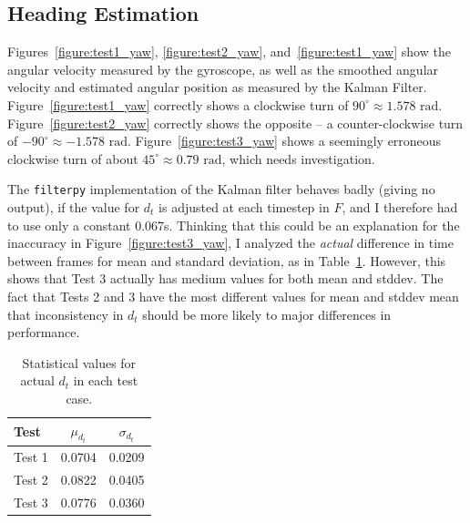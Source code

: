 \subsection{Heading Estimation}

Figures~\ref{figure:test1_yaw}, \ref{figure:test2_yaw}, and~\ref{figure:test1_yaw} show the
angular velocity measured by the gyroscope,
as well as the smoothed angular velocity and estimated angular position as measured by the Kalman Filter.
Figure~\ref{figure:test1_yaw} correctly shows a clockwise turn of $90^\circ \approx 1.578 \text{ rad}$.
Figure~\ref{figure:test2_yaw} correctly shows the opposite -- a counter-clockwise turn of
$-90^\circ \approx -1.578 \text{ rad}$.
Figure~\ref{figure:test3_yaw} shows a seemingly erroneous clockwise turn of about $45^\circ \approx 0.79\text{ rad}$, which needs investigation.

The \texttt{filterpy} implementation of the Kalman filter behaves badly (giving no output),
if the value for $d_t$ is adjusted at each timestep in $F$,
and I therefore had to use only a constant 0.067s.
Thinking that this could be an explanation for the inaccuracy in Figure~\ref{figure:test3_yaw},
I analyzed the \emph{actual} difference in time between frames for mean and standard deviation,
as in Table~\ref{table:dt_statistical_values}.
However, this shows that Test 3 actually has medium values for both mean and stddev.
The fact that Tests 2 and 3 have the most different values for mean and stddev mean
that inconsistency in $d_t$ should be more likely to major differences in performance.

\begin{table}
	\centering
	\begin{tabular}{|l|c|c|}
		\hline
		Test & $\mu_{d_t}$ & $\sigma_{d_t}$ \\\hline
		Test 1 & 0.0704 & 0.0209 \\\hline
		Test 2 & 0.0822 & 0.0405 \\\hline
		Test 3 & 0.0776 & 0.0360 \\\hline
	\end{tabular}
	\caption{Statistical values for actual $d_t$ in each test case.}
	\label{table:dt_statistical_values}
\end{table}


